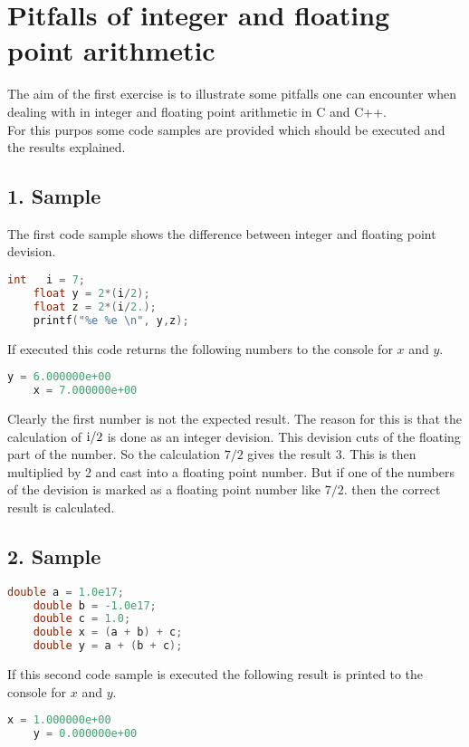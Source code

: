 \section{Pitfalls of integer and floating point arithmetic}

The aim of the first exercise is to illustrate some pitfalls one can encounter when dealing
with in integer and floating point arithmetic in C and C++.\\
For this purpos some code samples are provided which should be executed and the results 
explained.

\subsection*{1. Sample}
The first code sample shows the difference between integer and floating point devision.
\begin{lstlisting}[language=C++]
    int   i = 7;
    float y = 2*(i/2);
    float z = 2*(i/2.);
    printf("%e %e \n", y,z); 
\end{lstlisting}
If executed this code returns the following numbers to the console 
for $x$ and $y$.

\begin{lstlisting}[language=C++]
    y = 6.000000e+00
    x = 7.000000e+00
\end{lstlisting}

Clearly the first number is not the expected result. The reason for this is that the calculation of 
$\textnormal{i}/2$ is done as an integer devision. This devision cuts of the floating part of the number.
So the calculation $7/2$ gives the result 3. This is then multiplied by 2 and cast into a
floating point number. But if one of the numbers of the devision is marked as a floating 
point number like $7/2.$ then the correct result is calculated.

\subsection*{2. Sample}
\begin{lstlisting}[language=C++]
    double a = 1.0e17;
    double b = -1.0e17;
    double c = 1.0;
    double x = (a + b) + c;
    double y = a + (b + c);

\end{lstlisting}

If this second code sample is executed the following 
result is printed to the console for $x$ and $y$.

\begin{lstlisting}[language=C++]
    x = 1.000000e+00
    y = 0.000000e+00 
    
\end{lstlisting}

